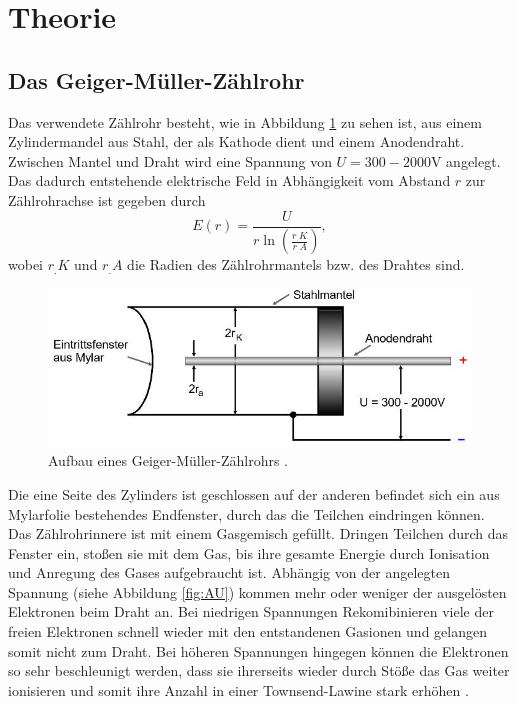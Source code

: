 \section{Theorie}
\label{sec:Theorie}

\subsection{Das Geiger-Müller-Zählrohr}
Das verwendete Zählrohr besteht, wie in Abbildung \ref{fig:GMZ} zu sehen ist, aus einem Zylindermandel aus Stahl, der als Kathode dient und einem Anodendraht. Zwischen Mantel und Draht wird eine Spannung von $U= 300 - 2000 \text{V}$ angelegt. Das dadurch entstehende elektrische Feld in Abhängigkeit vom Abstand $r$ zur Zählrohrachse ist gegeben durch
\[
E(r)=\frac{U}{r\ln\left(\frac{r_.K}{r_.A}\right)},
\]
wobei $r_.K$ und $r_.A$ die Radien des Zählrohrmantels bzw. des Drahtes sind.\newline
\begin{figure}
\centering
\includegraphics[scale=0.5]{content/images/aufbau1.jpg}
\caption{Aufbau eines Geiger-Müller-Zählrohrs \cite{V703}.}
\label{fig:GMZ}
\end{figure}
Die eine Seite des Zylinders ist geschlossen auf der anderen befindet sich ein aus Mylarfolie bestehendes Endfenster, durch das die Teilchen eindringen können. Das Zählrohrinnere ist mit einem Gasgemisch gefüllt.
Dringen Teilchen durch das Fenster ein, stoßen sie mit dem Gas, bis ihre gesamte Energie durch Ionisation und Anregung des Gases aufgebraucht ist.\newline
Abhängig von der angelegten Spannung (siehe Abbildung \ref{fig:AU})
kommen mehr oder weniger der ausgelösten Elektronen beim Draht an.
Bei niedrigen Spannungen Rekomibinieren viele der freien Elektronen schnell wieder mit den entstandenen Gasionen und gelangen somit nicht zum Draht. Bei höheren Spannungen hingegen können die Elektronen so sehr beschleunigt werden, dass sie ihrerseits wieder durch Stöße das Gas weiter ionisieren und somit ihre Anzahl in einer Townsend-Lawine stark erhöhen \cite{V703}.\newline
